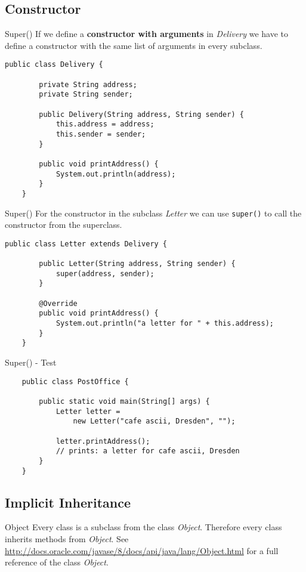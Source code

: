 \subsection{Constructor}
\begin{frame}[fragile]{Super()}
	If we define a \textbf{constructor with arguments} in \emph{Delivery} we have to define a constructor
	with the same list of arguments in every subclass.
	\begin{lstlisting}[basicstyle=\ttfamily\scriptsize]
	public class Delivery {
	
	    private String address;
	    private String sender;
	    
	    public Delivery(String address, String sender) {
	        this.address = address;
	        this.sender = sender;
	    }
	    	    
	    public void printAddress() {
	        System.out.println(address);
	    }
	}
	\end{lstlisting}
\end{frame}

\begin{frame}[fragile]{Super()}
	For the constructor in the subclass \emph{Letter} we can use \texttt{super()} to call the constructor
	from the superclass.
	\begin{lstlisting}[escapechar=!]
	public class Letter extends Delivery {

	    public Letter(String address, String sender) {
	        super(address, sender);
	    }
	
	    @Override
	    public void printAddress() {
	        System.out.println("a letter for " + this.address);    
	    }	
	}
	\end{lstlisting}
\end{frame}

\begin{frame}[fragile]{Super() - Test}
	\begin{lstlisting}
	public class PostOffice {
	    
	    public static void main(String[] args) {	    
	        Letter letter = 
	            new Letter("cafe ascii, Dresden", "");
	        
	        letter.printAddress();
	        // prints: a letter for cafe ascii, Dresden
	    }
	}
	\end{lstlisting}
\end{frame}

\subsection{Implicit Inheritance}
\begin{frame}{Object}
	Every class is a subclass from the class \emph{Object}. 
	Therefore every class inherits methods from \emph{Object}.
	\vfill
	See \scriptsize\url{http://docs.oracle.com/javase/8/docs/api/java/lang/Object.html} \normalsize for
	a full reference of the class \emph{Object}.
\end{frame}

